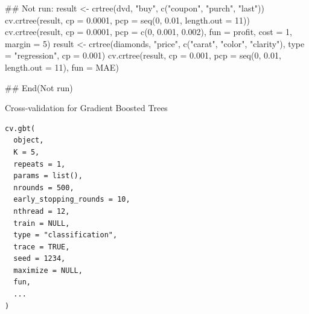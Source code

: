 \documentclass[a4paper]{book}
\begin{document}
%
\begin{Examples}
\begin{ExampleCode}
## Not run: 
result <- crtree(dvd, "buy", c("coupon", "purch", "last"))
cv.crtree(result, cp = 0.0001, pcp = seq(0, 0.01, length.out = 11))
cv.crtree(result, cp = 0.0001, pcp = c(0, 0.001, 0.002), fun = profit, cost = 1, margin = 5)
result <- crtree(diamonds, "price", c("carat", "color", "clarity"), type = "regression", cp = 0.001)
cv.crtree(result, cp = 0.001, pcp = seq(0, 0.01, length.out = 11), fun = MAE)

## End(Not run)

\end{ExampleCode}
\end{Examples}
%
\begin{Description}
Cross-validation for Gradient Boosted Trees
\end{Description}
%
\begin{Usage}
\begin{verbatim}
cv.gbt(
  object,
  K = 5,
  repeats = 1,
  params = list(),
  nrounds = 500,
  early_stopping_rounds = 10,
  nthread = 12,
  train = NULL,
  type = "classification",
  trace = TRUE,
  seed = 1234,
  maximize = NULL,
  fun,
  ...
)
\end{verbatim}
\end{Usage}
%
\end{document}
